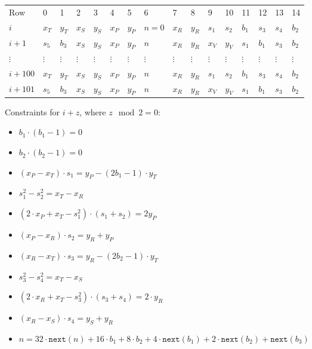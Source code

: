 \begin{center}
\begin{table}[H]
\begin{tabular}{llllllllllllllll}
 Row 		& 0 & 1 & 2 & 3 & 4 & 5 & 6 & 7 & 8 & 9 & 10 & 11 & 12 & 13 & 14 \\
 $i$ 			& $x_T$ & $y_T$ & $x_S$ & $y_S$ & $x_P$ & $y_P$ & $n=0$ & $x_R$ & $y_R$ & $s_1$ & $s_2$ & $b_1$ & $s_3$ & $s_4$ & $b_2$ \\
 $i + 1$	& $s_5$ & $b_3$ & $x_S$ & $y_S$ & $x_P$ & $y_P$ & $n$ & $x_R$ & $y_R$ & $x_V$ & $y_V$ & $s_1$ & $b_1$ & $s_3$ & $b_2$ \\
 $\vdots$	& $\vdots$ & $\vdots$ & $\vdots$ & $\vdots$ & $\vdots$ & $\vdots$ & $\vdots$ & $\vdots$ & $\vdots$ & $\vdots$ & $\vdots$ & $\vdots$ & $\vdots$ & $\vdots$ & $\vdots$ \\
 $i + 100$	& $x_T$ & $y_T$ & $x_S$ & $y_S$ & $x_P$ & $y_P$ & $n$ & $x_R$ & $y_R$ & $s_1$ & $s_2$ & $b_1$ & $s_3$ & $s_4$ & $b_2$ \\
 $i + 101$	& $s_5$ & $b_3$ & $x_S$ & $y_S$ & $x_P$ & $y_P$ & $n$ & $x_R$ & $y_R$ & $x_V$ & $y_V$ & $s_1$ & $b_1$ & $s_3$ & $b_2$ \\
\end{tabular}
\end{table}
\end{center}

Constraints for $i + z$, where $z\mod 2 = 0$:
\begin{itemize}
	\item $b_1 \cdot (b_1 - 1) = 0$
	\item $b_2 \cdot (b_2 - 1) = 0$
	\item $(x_P - x_T) \cdot s_1 = y_P - (2b_1 - 1) \cdot y_T$
	\item $s_1^2 - s_2^2 = x_T - x_R$
	\item $(2 \cdot x_P + x_T - s_1^2) \cdot (s_1 + s_2) = 2y_P$
	\item $(x_P - x_R) \cdot s_2 = y_R + y_P$
	\item $(x_R - x_T) \cdot s_3 = y_R - (2b_2 - 1) \cdot y_T$
	\item $s_3^2 - s_4^2 = x_T - x_S$
	\item $(2 \cdot x_R + x_T - s_3^2) \cdot (s_3 + s_4) = 2 \cdot y_R$
	\item $(x_R - x_S) \cdot s_4 = y_S + y_R$
	\item $n = 32 \cdot \texttt{next}(n) + 16 \cdot b_1 + 8 \cdot b_2 + 4 \cdot \texttt{next}(b_1) + 2 \cdot \texttt{next}(b_2) + \texttt{next}(b_3)$
\end{itemize}

